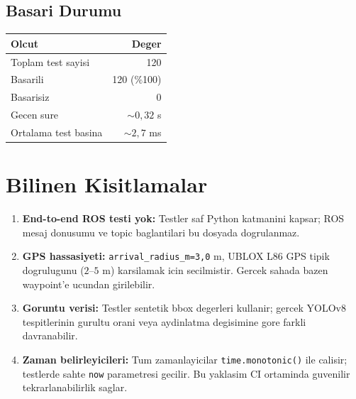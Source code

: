 \documentclass[a4paper,12pt]{article}
\begin{document}
\subsection{Basari Durumu}

\begin{center}
\begin{tabular}{lr}
  \toprule
  Olcut                 & Deger\\
  \midrule
  Toplam test sayisi    & 120\\
  Basarili              & 120 ($\%$100)\\
  Basarisiz             & 0\\
  Gecen sure            & $\sim 0{,}32$ s\\
  Ortalama test basina  & $\sim 2{,}7$ ms\\
  \bottomrule
\end{tabular}
\end{center}

\section{Bilinen Kisitlamalar}

\begin{enumerate}
  \item \textbf{End-to-end ROS testi yok:} Testler saf Python katmanini
        kapsar; ROS mesaj donusumu ve topic baglantilari bu dosyada
        dogrulanmaz.

  \item \textbf{GPS hassasiyeti:} \texttt{arrival\_radius\_m=3{,}0} m,
        UBLOX L86 GPS tipik dogrulugunu ($2$--$5$ m) karsilamak icin
        secilmistir. Gercek sahada bazen waypoint'e ucundan girilebilir.

  \item \textbf{Goruntu verisi:} Testler sentetik bbox degerleri kullanir;
        gercek YOLOv8 tespitlerinin gurultu orani veya aydinlatma
        degisimine gore farkli davranabilir.

  \item \textbf{Zaman belirleyicileri:} Tum zamanlayicilar
        \texttt{time.monotonic()} ile calisir; testlerde sahte
        \texttt{now} parametresi gecilir. Bu yaklasim CI ortaminda
        guvenilir tekrarlanabilirlik saglar.
\end{enumerate}
\end{document}
